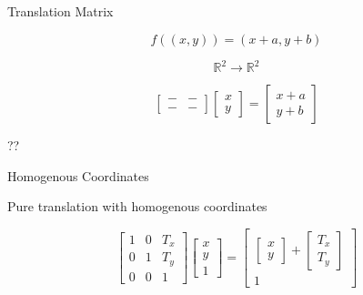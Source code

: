 \documentclass{beamer}
\begin{document}

\begin{frame}{Translation Matrix}

\[ f((x, y)) = (x + a, y + b) \]

\[ \mathbb{R}^2 \rightarrow \mathbb{R}^2 \]

\[  \left[  \begin{array}{cc} - & - \\ - & -  \end{array} \right] \left[ \begin{array}{c} x \\ y \end{array} \right] =  \left[ \begin{array}{c} x + a \\ y + b \end{array} \right] \]

??

\end{frame}

\begin{frame}{Homogenous Coordinates}

Pure translation with homogenous coordinates

\[ \left[ \begin{array}{ccc} 1 & 0 & T_x \\ 0 & 1 & T_y \\ 0 & 0 & 1 \end{array} \right] \left[ \begin{array}{c} x \\ y \\ 1 \end{array} \right] = \left[  \begin{array}{c}  \left[ \begin{array}{c} x \\ y \end{array} \right] + \left[ \begin{array}{c} T_x \\ T_y \end{array} \right]  \\ 1 \end{array}  \right] \]

\end{frame}
\end{document}
